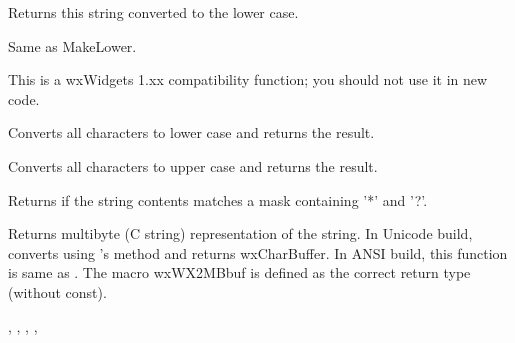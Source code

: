 \label{wxstringlower}


Returns this string converted to the lower case.


\label{wxstringlowercase}


Same as MakeLower.

This is a wxWidgets 1.xx compatibility function; you should not use it in new code.


\label{wxstringmakelower}


Converts all characters to lower case and returns the result.


\label{wxstringmakeupper}


Converts all characters to upper case and returns the result.


\label{wxstringmatches}


Returns \true if the string contents matches a mask containing '*' and '?'.


\label{wxstringmbstr}



Returns multibyte (C string) representation of the string.
In Unicode build, converts using 's 
method and returns wxCharBuffer. In ANSI build, this function is same
as .
The macro wxWX2MBbuf is defined as the correct return type (without const).


,
, ,
, 


\label{wxstringmid}


